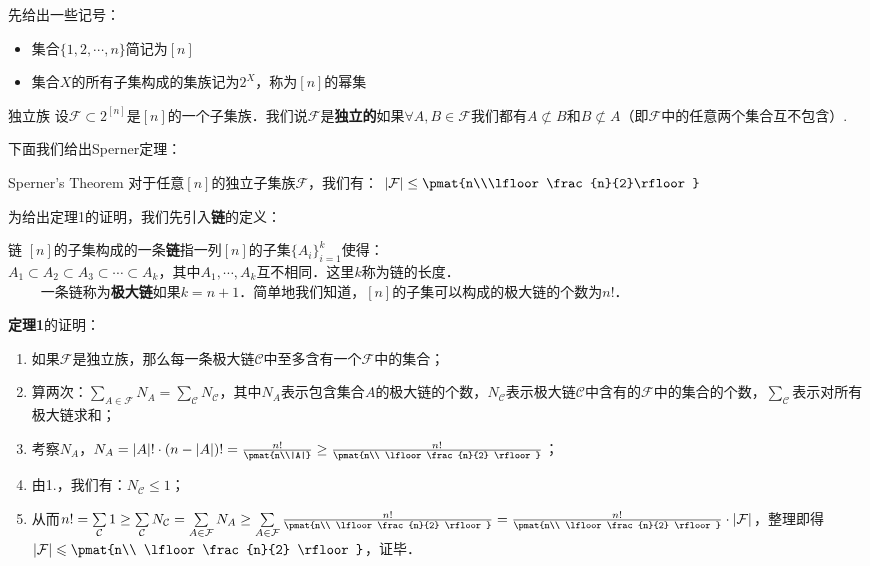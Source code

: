 
先给出一些记号：
\begin{itemize}
\item 集合$\{1,2,\cdots,n\}$简记为$[n]$
\item 集合$X$的所有子集构成的集族记为$2^{X}$，称为$[n]$的幂集
\end{itemize}

\begin{definition}{独立族}
设$\mathcal{F}\subset 2^{[n]}$是$[n]$的一个子集族．我们说$\mathcal{F}$是\textbf{独立的}如果$\forall A,B\in \mathcal{F}$我们都有$A\not\subset B$和$B\not\subset A$（即$\mathcal{F}$中的任意两个集合互不包含）.
\end{definition}

下面我们给出Sperner定理：
\begin{theorem}{Sperner's Theorem}
对于任意$[n]$的独立子集族$\mathcal{F}$，我们有：
$|\mathcal{F}|\leq \pmat{n\\\lfloor \frac{n}{2}\rfloor}$
\end{theorem}
为给出定理1的证明，我们先引入\textbf{链}的定义：
\begin{definition}{链}
$[n]$的子集构成的一条\textbf{链}指一列$[n]$的子集$\{A_i\}_{i=1}^{k}$使得：\\
$A_1\subset A_2\subset A_3\subset \cdots \subset A_k$，其中$A_1,\cdots,A_k$互不相同．这里$k$称为链的长度．\\
$\qquad$
一条链称为\textbf{极大链}如果$k=n+1$．简单地我们知道，$[n]$的子集可以构成的极大链的个数为$n!$．
\end{definition}

\textbf{定理1}的证明：\\
\begin{enumerate}
\item 如果$\mathcal{F}$是独立族，那么每一条极大链$\mathcal{C}$中至多含有一个$\mathcal{F}$中的集合；
\item 算两次：$\sum\limits_{A\in \mathcal{F}}N_A=\sum\limits_{\mathcal{C}}N_{\mathcal{C}}$，其中$N_A$表示包含集合$A$的极大链的个数，$N_{\mathcal{C}}$表示极大链$\mathcal{C}$中含有的$\mathcal{F}$中的集合的个数，$\sum\limits_{\mathcal{C}}$表示对所有极大链求和；
\item 考察$N_A$，$N_A=|A|!\cdot (n-|A|)!=\frac{n!}{\pmat{n\\|A|}}\geq \frac{n!}{\pmat{n\\ \lfloor\frac{n}{2} \rfloor}}$；
\item 由1.，我们有：$N_{\mathcal{C}}\leq 1$；
\item 从而$n!=\sum\limits_{\mathcal{C}}1\geq \sum\limits_{\mathcal{C}}N_{\mathcal{C}}=\sum\limits_{A\in \mathcal{F}}N_A\geq \sum\limits_{A\in \mathcal{F}}\frac{n!}{\pmat{n\\ \lfloor\frac{n}{2} \rfloor}}=\frac{n!}{\pmat{n\\ \lfloor\frac{n}{2} \rfloor}}\cdot |\mathcal{F}|$，整理即得$|\mathcal{F}|\leqslant\pmat{n\\ \lfloor\frac{n}{2} \rfloor}$，证毕．
\end{enumerate}

